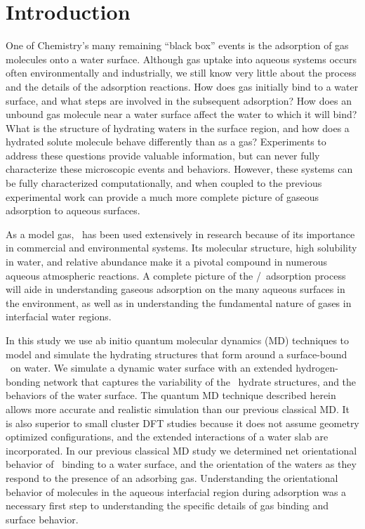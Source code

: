 \section {Introduction}

One of Chemistry's many remaining ``black box'' events is the adsorption of gas molecules onto a water surface. Although gas uptake into aqueous systems occurs often environmentally and industrially, we still know very little about the process and the details of the adsorption reactions. How does gas initially bind to a water surface, and what steps are involved in the subsequent adsorption? How does an unbound gas molecule near a water surface affect the water to which it will bind? What is the structure of hydrating waters in the surface region, and how does a hydrated solute molecule behave differently than as a gas? Experiments to address these questions provide valuable information, but can never fully characterize these microscopic events and behaviors. However, these systems can be fully characterized computationally, and when coupled to the previous experimental work can provide a much more complete picture of gaseous adsorption to aqueous surfaces.

As a model gas, \suldiox~has been used extensively in research because of its importance in commercial and environmental systems. Its molecular structure, high solubility in water, and relative abundance make it a pivotal compound in numerous aqueous atmospheric reactions. A complete picture of the \suldiox/\wat~adsorption process will aide in understanding gaseous adsorption on the many aqueous surfaces in the environment, as well as in understanding the fundamental nature of gases in interfacial water regions. 

In this study we use ab initio quantum molecular dynamics (MD) techniques to model and simulate the hydrating structures that form around a surface-bound \suldiox~on water. We simulate a dynamic water surface with an extended hydrogen-bonding network that captures the variability of the \suldiox~hydrate structures, and the behaviors of the water surface. The quantum MD technique described herein allows more accurate and realistic simulation than our previous classical MD. It is also superior to small cluster DFT studies because it does not assume geometry optimized configurations, and the extended interactions of a water slab are incorporated. In our previous classical MD study we determined net orientational behavior of \suldiox~binding to a water surface, and the orientation of the waters as they respond to the presence of an adsorbing gas. Understanding the orientational behavior of molecules in the aqueous interfacial region during adsorption was a necessary first step to understanding the specific details of gas binding and surface behavior. 

